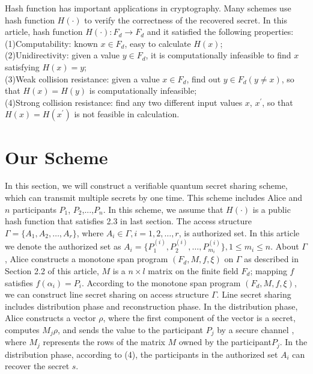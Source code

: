 \documentclass[pdflatex,sn-mathphys]{sn-jnl}%
\theoremstyle{thmstyleone}%
\theoremstyle{thmstyletwo}%
\theoremstyle{thmstylethree}%
\begin{document}
Hash function has important applications in cryptography\cite{ref-ur25,ref-ur26,ref-ur27,ref-ur28,ref-ur29,ref-ur30,ref-ur31}. Many schemes use hash function $H(\cdot)$ to verify the correctness of the recovered secret. In this article, hash function $H(\cdot):F_d \to F_d$ and it satisfied the following properties:\\
(1)Computability: known $x \in F_d $, easy to calculate $H(x)$;\\
(2)Unidirectivity: given a value $y\in F_d$, it is computationally infeasible to find $x$ satisfying $H(x)=y$;\\
(3)Weak collision resistance: given a value $x\in F_d$, find out $y\in F_d(y\ne x)$, so that $H(x)=H(y)$ is computationally infeasible;\\
(4)Strong collision resistance: find any two different input values $x$, $x^\prime$, so that $H(x)=H(x^\prime)$ is not feasible in calculation. 


\section{Our Scheme}\label{sec3}

In this section, we will construct a verifiable quantum secret sharing scheme, which can transmit multiple secrets by one time. This scheme includes Alice and $n$ participants $P_1$, $P_2$,...,$P_n$. In this scheme, we assume that $H(\cdot)$ is a public hash function that satisfies 2.3 in last section. The access structure $\varGamma=\lbrace{A_1,A_2,\dots,A_r}\rbrace$, where $A_i\in \varGamma,i=1,2,\dots,r$, is authorized set. In this article we denote the authorized set as $A_i=\lbrace{P_1^{(i)},P_2^{(i)},\dots,P_{m_i}^{(i)}}\rbrace,1\leq m_i\leq n$. About $\varGamma$, Alice constructs a monotone span program $(F_d,M,f,\xi)$ on $\varGamma$  as described in Section 2.2 of this article, $M$ is a $n\times l$ matrix on the finite field $F_d$; mapping $f$ satisfies $f(\alpha_i)=P_i$. According to the monotone span program $(F_d,M,f,\xi)$, we can construct line secret sharing on access structure $\varGamma$. Line secret sharing includes distribution phase and reconstruction phase. In the distribution phase, Alice constructs a vector $\rho$, where the first component of the vector is a secret, computes $M_j\rho$, and sends the value to the participant $P_j$ by a secure channel \cite{ref-ur32,ref-ur33}, where $M_j$ represents the rows of the matrix $M$ owned by the participant$P_j$. In the distribution phase, according to (4), the participants in the authorized set $A_i$ can recover the secret $s$.
\end{document}

